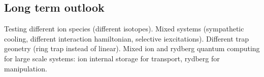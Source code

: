




\subsection{Long term outlook}

Testing different ion species (different isotopes). Mixed systems (sympathetic cooling, different interaction hamiltonian, selective iexcitations). Different trap geonetry (ring trap instead of linear). Mixed ion and rydberg quantum computing for large scale systems: ion internal storage for transport, rydberg for manipulation.